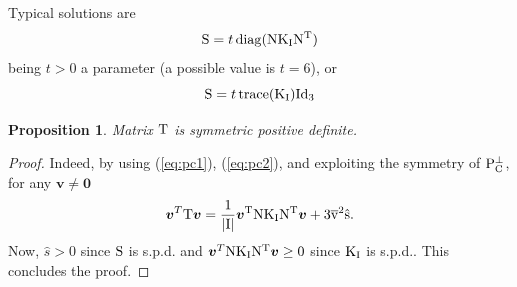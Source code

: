 \documentclass[11pt,a4paper,twoside]{article}
\newcommand{\N}{\ensuremath{\rm N}}
\newcommand{\PC}{\ensuremath{\rm P}_C^{\perp}}
\newcommand{\perm}{\ensuremath{\rm K}_I}
\newcommand{\trans}{\ensuremath{\rm T}}
\newtheorem{prop}{Proposition}
\begin{document}
Typical solutions are 
\begin{equation}
\label{eq:esse}
{\rm S}=t\operatorname{diag}(\N\perm\N^T)
\end{equation}
being $t>0$ a parameter (a possible value is $t=6$), or
\begin{equation}
\label{eq:esse}
{\rm S}=t\operatorname{trace}(\perm){\rm Id}_3
\end{equation}

\begin{prop}
Matrix $\trans$ is symmetric positive definite.
\end{prop}
\begin{proof}
  Indeed, by using (\ref{eq:pc1}), (\ref{eq:pc2}), and exploiting the
  symmetry of $\PC$, for any $\boldsymbol{v}\ne\boldsymbol{0}$
\[
\boldsymbol{v}^T\trans\boldsymbol{v}=
\dfrac{1}{|I|}\boldsymbol{v}^T\N\perm\N^T\boldsymbol{v}+
3\overline{v}^2\hat{s}.
\]
Now, $\hat{s}>0$ since ${\rm S}$ is s.p.d. and $\boldsymbol{v}^T\N\perm\N^T\boldsymbol{v}\ge 0$ since 
$\perm$ is s.p.d.. This concludes the proof.
\end{proof}
\end{document}
